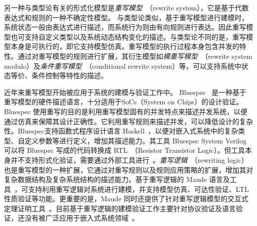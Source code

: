 另一种与类型论有关的形式化模型是\emph{重写模型}~\cite{DBLP:books/el/leeuwen90/DershowitzJ90,terese}（rewrite system），它是基于代数表达式和规则的一种不确定性模型。
与类型论类似，基于重写模型进行建模时，系统状态一般由表达式进行描述，而系统行为则由有向规则进行表达。因此重写模型也可支持自定义类型以及系统动态结构变化的描述。与类型论不同的是，重写模型本身是可执行的，即它支持模型仿真。重写模型的执行过程本身包含并发的特性。通过对重写模型的规则进行扩展，其衍生模型如\emph{模重写模型}~\cite{DBLP:journals/jacm/PetersonS81}（rewrite system modulo）及\emph{条件重写模型}~\cite{DBLP:conf/ctrs/Gramlich94}（conditional rewrite system）等，可以支持系统中状态等价、条件控制等特性的描述。  

近年来重写模型开始被应用于系统的建模与验证工作中。 Bluespec~\cite{nikhil2008bluespec} 是一种基于重写模型的硬件描述语言，十分适用于SoCs（System on Chips）的设计验证。Bluespec 使用重写的目的是利用重写模型固有的并发特点来描述并发系统，以便通过仿真来保障其设计正确性。它利用重写规则来描述并发，可以降低设计的复杂性。Bluespec支持函数式程序设计语言 Haskell~\cite{DBLP:books/daglib/0033100}，以便对嵌入式系统中的复杂类型、自定义参数等进行定义，增加其描述能力。其工具 Bluespec System Verilog~\cite{DBLP:conf/memocode/Nikhil04} 可以将 Bluespec 写成的代码转换成 RTL~\cite{DBLP:books/daglib/0067153}（Resistor Transistor Logic）。但工具本身并不支持形式化验证，需要通过外部工具进行~\cite{DBLP:conf/mtv/SinghS07}。\emph{重写逻辑}~\cite{DBLP:journals/tcs/Marte-OlietM02,DBLP:journals/jlp/Meseguer12}（rewriting logic）也是重写模型的一种扩展，它通过对重写规则以及规则应用策略的扩展，增加其对复杂数据结构及复杂系统结构的描述能力。基于重写逻辑的 Maude 语言及工具~\cite{DBLP:journals/tcs/ClavelDELMMQ02,DBLP:journals/lisp/OlveczkyM07}，可支持利用重写逻辑对系统进行建模，并支持模型仿真、可达性验证、LTL 性质验证等功能。更重要的是，Maude 同时还提供了针对重写逻辑模型的交互式定理证明工具~\cite{DBLP:journals/jucs/ClavelPR06}。目前基于重写逻辑的建模验证工作主要针对协议验证及语言验证，还没有被广泛应用于嵌入式系统领域~\cite{DBLP:journals/jlp/Meseguer12,DBLP:journals/iandc/MeseguerR13}。

